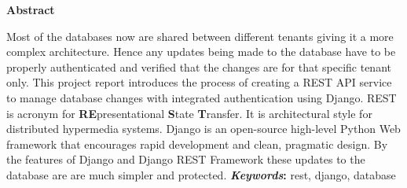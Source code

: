\thispagestyle{empty} 
\vspace{1.0in}
\centerline{\Large{\bf Abstract}}
\vspace{.77cm}

\noindent
Most of the databases now are shared between different tenants giving it a more
complex architecture. Hence any updates being made to the database have to be
properly authenticated and verified that the changes are for that specific
tenant only. This project report introduces the process of creating a REST API
service to manage database changes with integrated authentication using Django.
REST is acronym for {\bf{RE}}presentational {\bf{S}}tate {\bf{T}}ransfer.
It is architectural style for distributed hypermedia systems. Django is an
open-source high-level Python Web framework that encourages rapid development
and clean, pragmatic design. By the features of Django and Django REST
Framework these updates to the database are are much simpler and protected.
\textbf{\textit{Keywords}:} rest, django, database
